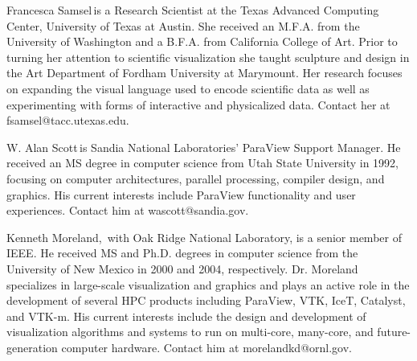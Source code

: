 \documentclass{IEEEcsmag}
\begin{document}



\begin{IEEEbiography}{Francesca Samsel}{\,}is a Research Scientist at the Texas Advanced Computing Center, University of Texas at Austin. She received an M.F.A. from the University of Washington and a B.F.A. from California College of Art. Prior to turning her attention to scientific visualization she taught sculpture and design in the Art Department of Fordham University at Marymount. Her research focuses on expanding the visual language used to encode scientific data as well as experimenting with forms of interactive and physicalized data. Contact her at fsamsel@tacc.utexas.edu.
\end{IEEEbiography}

\begin{IEEEbiography}{W. Alan Scott}{\,}is Sandia National Laboratories' ParaView Support Manager.  He received an MS degree in computer science from Utah State University in 1992, focusing on computer architectures, parallel processing, compiler design, and graphics.  His current interests include ParaView functionality and user experiences.  Contact him at wascott@sandia.gov.
\end{IEEEbiography}

\begin{IEEEbiography}{Kenneth Moreland,}{\,} with Oak Ridge National Laboratory, is a senior member of IEEE.
  He received MS and Ph.D. degrees in computer science from the University of New Mexico in 2000 and 2004, respectively.
  Dr. Moreland specializes in large-scale visualization and graphics and plays an active role in the development of several HPC products including ParaView, VTK, IceT, Catalyst, and VTK-m.
  His current interests include the design and development of visualization algorithms and systems to run on multi-core, many-core, and future-generation computer hardware.
  Contact him at morelandkd@ornl.gov.
\end{IEEEbiography}
\end{document}
